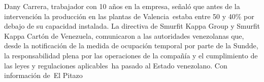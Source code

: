 \documentclass{article}%
\begin{document}
\newline%
%
Dany Carrera, trabajador con 10 años en la empresa, señaló que antes de la intervención la producción en las plantas de Valencia~estaba entre 50 y 40\% por debajo de su capacidad instalada.%
\newline%
%
La directiva de Smurfit Kappa Group y Smurfit Kappa Cartón de Venezuela, comunicaron a las autoridades venezolanas que, desde la notificación de la medida de ocupación temporal por parte de la Sundde, la responsabilidad plena por las operaciones de la compañía y el cumplimiento de las leyes y regulaciones aplicables~ha pasado al Estado venezolano.%
\newline%
%
Con información de~El Pitazo%
\newline%
%
\end{document}
